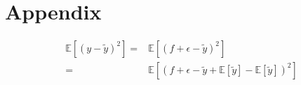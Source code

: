 \onecolumn
\setcounter{equation}{0}
\renewcommand\theequation{A.\arabic{equation}}
\section*{Appendix}
\label{sec:appendix}

\begin{align*}
	\mathds{E}\left[\left(y-\tilde{y}\right)^2\right] =& \mathds{E}\left[\left(f+\epsilon - \tilde{y}\right)^2\right] \\
	=& \mathds{E}\left[\left(f+\epsilon - \tilde{y} + \mathds{E}\left[\tilde{y}\right] - \mathds{E}\left[\tilde{y}\right]\right)^2\right]
\end{align*}
